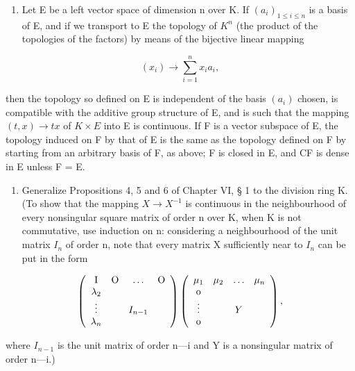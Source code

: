 \begin{enumerate}
\def\labelenumi{\alph{enumi})}
\tightlist
\item
  Let E be a left vector space of dimension n over K. If \((a_{i})_{1\leqslant i\leqslant n}\) is a basis of E, and if we transport to E the topology of \(K^{n}\) (the product of the topologies of the factors) by means of the bijective linear mapping
\end{enumerate}

\[
(x _ {i}) \rightarrow \sum_ {i = 1} ^ {n} x _ {i} a _ {i},
\]

then the topology so defined on E is independent of the basis \((a_{i})\) chosen, is compatible with the additive group structure of E, and is such that the mapping \((t, x) \to tx\) of \(K \times E\) into E is continuous. If F is a vector subspace of E, the topology induced on F by that of E is the same as the topology defined on F by starting from an arbitrary basis of F, as above; F is closed in E, and CF is dense in E unless F = E.

\begin{enumerate}
\def\labelenumi{\alph{enumi})}
\setcounter{enumi}{1}
\tightlist
\item
  Generalize Propositions 4, 5 and 6 of Chapter VI, § 1 to the division ring K. (To show that the mapping \(X \to X^{-1}\) is continuous in the neighbourhood of every nonsingular square matrix of order n over K, when K is not commutative, use induction on n: considering a neighbourhood of the unit matrix \(I_{n}\) of order n, note that every matrix X sufficiently near to \(I_{n}\) can be put in the form
\end{enumerate}

\[
\left( \begin{array}{c c c c} \mathrm{I} & \mathrm{O} & \ldots & \mathrm{O} \\ \lambda_ {2} & & & \\ \vdots & & I _ {n - 1} & \\ \lambda_ {n} & & & \end{array} \right) \left( \begin{array}{c c c c} \mu_ {1} & \mu_ {2} & \ldots & \mu_ {n} \\ \mathrm{o} & & & \\ \vdots & & Y & \\ \mathrm{o} & & & \end{array} \right),
\]

where \(I_{n-1}\) is the unit matrix of order n---i and Y is a nonsingular matrix of order n---i.)

